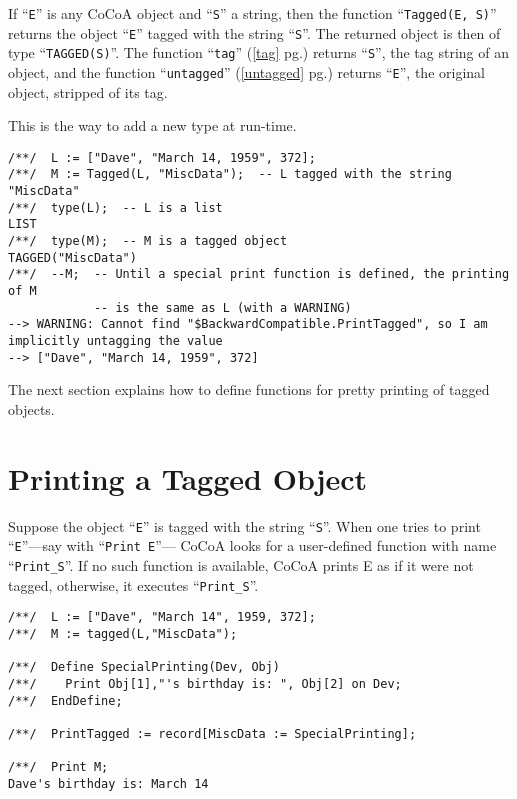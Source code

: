 \documentclass[a4paper]{mybook}
\begin{document}
        
If ``\verb&E&'' is any CoCoA object and ``\verb&S&'' a string, then the function
``\verb&Tagged(E, S)&'' returns the object ``\verb&E&'' tagged with the string ``\verb&S&''.
The returned object is then of type ``\verb&TAGGED(S)&''.
The function ``\verb&tag&'' (\ref{tag} pg.\pageref{tag}) returns ``\verb&S&'', the tag string of an object,
and the function ``\verb&untagged&'' (\ref{untagged} pg.\pageref{untagged}) returns ``\verb&E&'', the
original object, stripped of its tag.
\par 
This is the way to add a new type at run-time.
\begin{Verbatim}[label=example, rulecolor=\color{PineGreen}, frame=single]
/**/  L := ["Dave", "March 14, 1959", 372];
/**/  M := Tagged(L, "MiscData");  -- L tagged with the string "MiscData"
/**/  type(L);  -- L is a list
LIST
/**/  type(M);  -- M is a tagged object
TAGGED("MiscData")
/**/  --M;  -- Until a special print function is defined, the printing of M
            -- is the same as L (with a WARNING)
--> WARNING: Cannot find "$BackwardCompatible.PrintTagged", so I am implicitly untagging the value
--> ["Dave", "March 14, 1959", 372]
\end{Verbatim}

The next section explains how to define functions for pretty printing
of tagged objects.


\section{Printing a Tagged Object}
\label{Printing a Tagged Object}

        
Suppose the object ``\verb&E&'' is tagged with the string ``\verb&S&''.
When one tries to print ``\verb&E&''---say with ``\verb&Print E&''---
CoCoA looks for a user-defined function with name ``\verb&Print_S&''.  If no such function is
available, CoCoA prints E as if it were not tagged, otherwise, it
executes ``\verb&Print_S&''.
\begin{Verbatim}[label=example, rulecolor=\color{PineGreen}, frame=single]
/**/  L := ["Dave", "March 14", 1959, 372];
/**/  M := tagged(L,"MiscData");

/**/  Define SpecialPrinting(Dev, Obj)
/**/    Print Obj[1],"'s birthday is: ", Obj[2] on Dev;
/**/  EndDefine;

/**/  PrintTagged := record[MiscData := SpecialPrinting];

/**/  Print M;
Dave's birthday is: March 14
\end{Verbatim}
\end{document}
